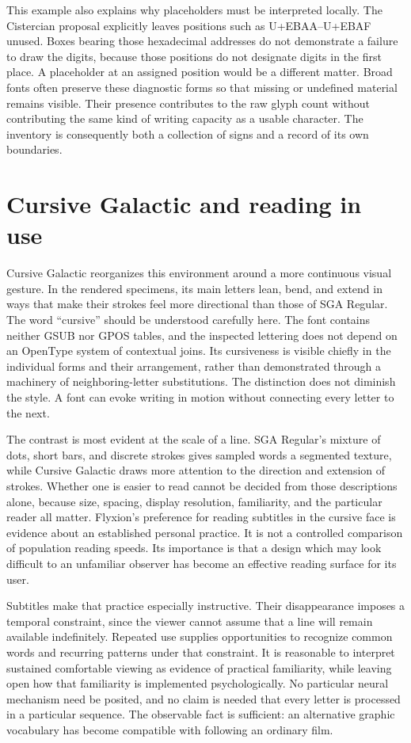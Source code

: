 \documentclass[11pt]{article}
\begin{document}
This example also explains why placeholders must be interpreted locally. The Cistercian proposal explicitly leaves positions such as U+EBAA--U+EBAF unused. Boxes bearing those hexadecimal addresses do not demonstrate a failure to draw the digits, because those positions do not designate digits in the first place. A placeholder at an assigned position would be a different matter. Broad fonts often preserve these diagnostic forms so that missing or undefined material remains visible. Their presence contributes to the raw glyph count without contributing the same kind of writing capacity as a usable character. The inventory is consequently both a collection of signs and a record of its own boundaries.

\section{Cursive Galactic and reading in use}

Cursive Galactic reorganizes this environment around a more continuous visual gesture. In the rendered specimens, its main letters lean, bend, and extend in ways that make their strokes feel more directional than those of SGA Regular. The word ``cursive'' should be understood carefully here. The font contains neither GSUB nor GPOS tables, and the inspected lettering does not depend on an OpenType system of contextual joins. Its cursiveness is visible chiefly in the individual forms and their arrangement, rather than demonstrated through a machinery of neighboring-letter substitutions. The distinction does not diminish the style. A font can evoke writing in motion without connecting every letter to the next.

The contrast is most evident at the scale of a line. SGA Regular's mixture of dots, short bars, and discrete strokes gives sampled words a segmented texture, while Cursive Galactic draws more attention to the direction and extension of strokes. Whether one is easier to read cannot be decided from those descriptions alone, because size, spacing, display resolution, familiarity, and the particular reader all matter. Flyxion's preference for reading subtitles in the cursive face is evidence about an established personal practice. It is not a controlled comparison of population reading speeds. Its importance is that a design which may look difficult to an unfamiliar observer has become an effective reading surface for its user.

Subtitles make that practice especially instructive. Their disappearance imposes a temporal constraint, since the viewer cannot assume that a line will remain available indefinitely. Repeated use supplies opportunities to recognize common words and recurring patterns under that constraint. It is reasonable to interpret sustained comfortable viewing as evidence of practical familiarity, while leaving open how that familiarity is implemented psychologically. No particular neural mechanism need be posited, and no claim is needed that every letter is processed in a particular sequence. The observable fact is sufficient: an alternative graphic vocabulary has become compatible with following an ordinary film.
\end{document}
